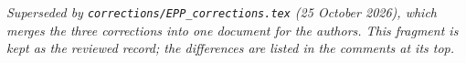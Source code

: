 \noindent\textit{Superseded by \texttt{corrections/EPP\_corrections.tex} (25 October 2026), which merges the three corrections into one document for the authors. This fragment is kept as the reviewed record; the differences are listed in the comments at its top.}\par


